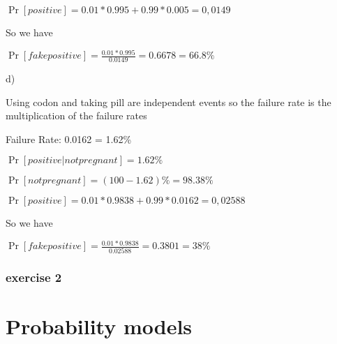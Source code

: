\documentclass{book}
\begin{document}
$\Pr[positive]=0.01*0.995+0.99*0.005=0,0149$

So we have

$\Pr[fake positive] = \frac{0.01*0.995}{0.0149}=0.6678=66.8\%$

d)

Using codon and taking pill are independent events so the failure rate is the multiplication of the failure rates

Failure Rate: 0.0162 = 1.62\%

$\Pr[positive|not pregnant] = 1.62\%$

$\Pr[not pregnant]= (100-1.62)\%=98.38\%$

$\Pr[positive]=0.01*0.9838+0.99*0.0162=0,02588$

So we have

$\Pr[fake positive] = \frac{0.01*0.9838}{0.02588}=0.3801=38\%$

\subsubsection{exercise 2}


\section{Probability models}
\end{document}

